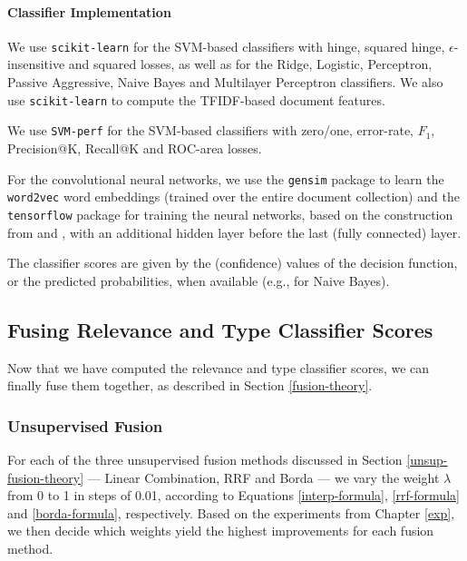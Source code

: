 \paragraph{Classifier Implementation}
We use \texttt{scikit-learn} \cite{scikit} for the SVM-based classifiers with hinge,
squared hinge, $\epsilon$-insensitive and squared losses, as well as for the Ridge, Logistic, Perceptron,
Passive Aggressive, Naive Bayes and Multilayer Perceptron classifiers.
We also use \texttt{scikit-learn} to compute the TFIDF-based document features.

We use \texttt{SVM-perf} \cite{svmperf3,svmperf1,svmperf2}
for the SVM-based classifiers with zero/one, error-rate, $F_1$, Precision@K, Recall@K and ROC-area losses.

For the convolutional neural networks, we use the \texttt{gensim} package \cite{gensim} to learn the \texttt{word2vec}
word embeddings (trained over the entire document collection)
and the \texttt{tensorflow} package \cite{tf} for training the neural networks, based on the construction
from \cite{cnn} and \cite{cnn-code}, with an additional hidden layer before the last (fully connected) layer.

The classifier scores are given by the (confidence) values of the decision function, or the predicted probabilities,
when available (e.g., for Naive Bayes).

\subsection{Fusing Relevance and Type Classifier Scores}
Now that we have computed the relevance and type classifier scores, we can finally fuse them together,
as described in Section \ref{fusion-theory}.

\subsubsection{Unsupervised Fusion}\label{impl-unsup}
For each of the three unsupervised fusion methods discussed in Section \ref{unsup-fusion-theory}
--- Linear Combination, RRF and Borda --- we vary the weight $\lambda$ from 0 to 1 in steps of 0.01,
according to Equations \ref{interp-formula}, \ref{rrf-formula} and \ref{borda-formula}, respectively.
Based on the experiments from Chapter \ref{exp}, we then decide
which weights yield the highest improvements for each fusion method.


